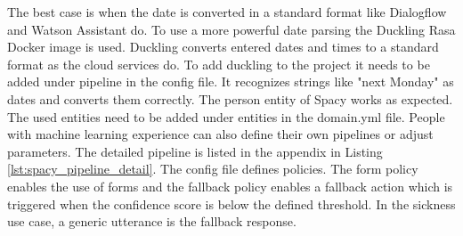 The best case is when the date is converted in a standard format like 
Dialogflow and Watson Assistant do.
To use a more powerful date parsing the Duckling\cite{duckling} Rasa Docker image is used.
Duckling converts entered dates and times to a standard format as the cloud services do.
To add duckling to the project it needs to be added under pipeline in the config file.
It recognizes strings like "next Monday" as dates and converts them correctly.
The person entity of Spacy works as expected.
The used entities need to be added under entities in the domain.yml file.
People with machine learning experience can also define their own pipelines or adjust parameters.
The detailed pipeline is listed in the appendix in Listing \ref{lst:spacy_pipeline_detail}.
The config file defines policies.
The form policy enables the use of forms and the fallback policy enables a fallback action which is triggered when the confidence score is below the defined threshold. 
In the sickness use case, a generic utterance is the fallback response. 


